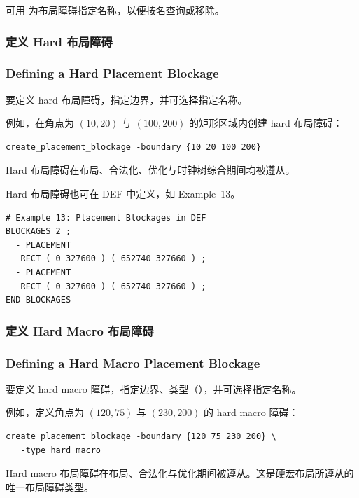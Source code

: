 可用  为布局障碍指定名称，以便按名查询或移除。

\subsubsection{定义 Hard 布局障碍}
\subsubsection*{Defining a Hard Placement Blockage}

要定义 hard 布局障碍，指定边界，并可选择指定名称。

例如，在角点为 $(10, 20)$ 与 $(100, 200)$ 的矩形区域内创建 hard 布局障碍：
\begin{lstlisting}
create_placement_blockage -boundary {10 20 100 200}
\end{lstlisting}

\begin{noteBox}
Hard 布局障碍在布局、合法化、优化与时钟树综合期间均被遵从。
\end{noteBox}

Hard 布局障碍也可在 DEF 中定义，如 Example~13。

\begin{lstlisting}
# Example 13: Placement Blockages in DEF
BLOCKAGES 2 ;
  - PLACEMENT
   RECT ( 0 327600 ) ( 652740 327660 ) ;
  - PLACEMENT
   RECT ( 0 327600 ) ( 652740 327660 ) ;
END BLOCKAGES
\end{lstlisting}

\subsubsection{定义 Hard Macro 布局障碍}
\subsubsection*{Defining a Hard Macro Placement Blockage}

要定义 hard macro 障碍，指定边界、类型（），并可选择指定名称。

例如，定义角点为 $(120, 75)$ 与 $(230, 200)$ 的 hard macro 障碍：
\begin{lstlisting}
create_placement_blockage -boundary {120 75 230 200} \
   -type hard_macro
\end{lstlisting}

\begin{noteBox}
Hard macro 布局障碍在布局、合法化与优化期间被遵从。这是硬宏布局所遵从的唯一布局障碍类型。
\end{noteBox}

